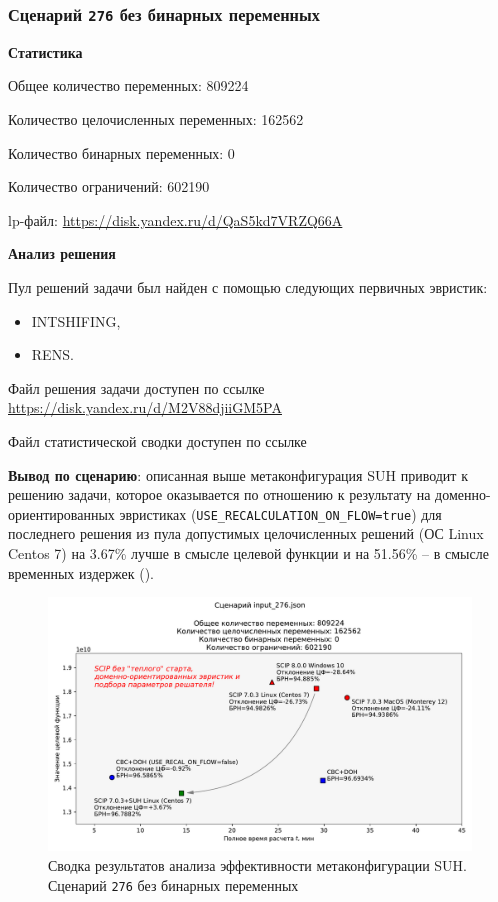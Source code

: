 \documentclass[%
	11pt,
	a4paper,
	utf8,
		]{article}
\begin{document}
\subsubsection{Сценарий \texttt{276} без бинарных переменных}

\textbf{Статистика}\vspace*{1mm}

Общее количество переменных: 809224

Количество целочисленных переменных: 162562

Количество бинарных переменных: 0

Количество ограничений: 602190

lp-файл: \url{https://disk.yandex.ru/d/QaS5kd7VRZQ66A}

\vspace*{5mm}\textbf{Анализ решения}\vspace*{1mm}

Пул решений задачи был найден с помощью следующих первичных эвристик:
\begin{itemize}
	\item INTSHIFING,
	
	\item RENS.
\end{itemize}

Файл решения задачи доступен по ссылке \url{https://disk.yandex.ru/d/M2V88djiiGM5PA}

Файл статистической сводки доступен по ссылке \url{}

\vspace*{3mm}
\textbf{Вывод по сценарию}: описанная выше метаконфигурация SUH приводит к решению задачи, которое оказывается по отношению к результату на доменно-ориентированных эвристиках (\verb|USE_RECALCULATION_ON_FLOW=true|) для последнего решения из пула допустимых целочисленных решений (ОС Linux Centos 7) на 3.67\% лучше в смысле целевой функции и на 51.56\% -- в смысле временных издержек ().

\begin{figure}[!h]
	\centering
	\includegraphics[scale=0.6]{figures/summary_276.pdf}
	\caption{Сводка результатов анализа эффективности метаконфигурации SUH. \\Сценарий \texttt{276} без бинарных переменных}\label{fig:summary_276}
\end{figure}
\end{document}
